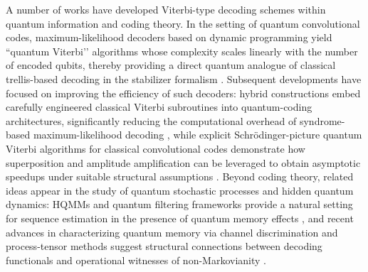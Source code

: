 \documentclass[12pt, reco]{article}
\begin{document}
A number of works have developed Viterbi-type decoding schemes within quantum information and coding theory. In the setting of quantum convolutional codes, maximum-likelihood decoders based on dynamic programming yield “quantum Viterbi’’ algorithms whose complexity scales linearly with the number of encoded qubits, thereby providing a direct quantum analogue of classical trellis-based decoding in the stabilizer formalism \cite{OllivierTillichPRL2003,OllivierTillich2006,WildeQECBook2013}. Subsequent developments have focused on improving the efficiency of such decoders: hybrid constructions embed carefully engineered classical Viterbi subroutines into quantum-coding architectures, significantly reducing the computational overhead of syndrome-based maximum-likelihood decoding \cite{TanLi2010}, while explicit Schr\"odinger-picture quantum Viterbi algorithms for classical convolutional codes demonstrate how superposition and amplitude amplification can be leveraged to obtain asymptotic speedups under suitable structural assumptions \cite{GriceMeyer2015}. Beyond coding theory, related ideas appear in the study of quantum stochastic processes and hidden quantum dynamics: HQMMs and quantum filtering frameworks provide a natural setting for sequence estimation in the presence of quantum memory effects \cite{ticozzi2008,HY2018,SSP15,J22}, and recent advances in characterizing quantum memory via channel discrimination and process-tensor methods suggest structural connections between decoding functionals and operational witnesses of non-Markovianity \cite{TaElM,OZNPQ26}.
\end{document}
